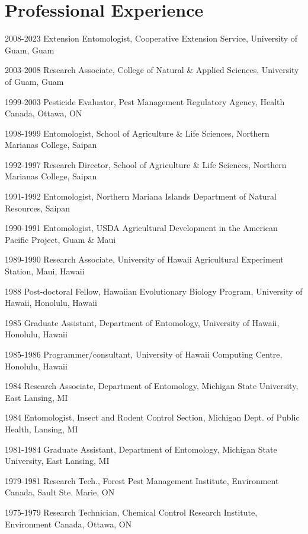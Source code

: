 \documentclass[12pt,english]{simplecv}
\begin{document}
\section{Professional Experience}
\begin{topic}
\item [{2008-2023}] Extension Entomologist, Cooperative Extension Service, University of Guam, Guam 
\item [{2003-2008}] Research Associate, College of Natural \& Applied Sciences, University of Guam, Guam 
\item [{1999-2003}] Pesticide Evaluator, Pest Management Regulatory Agency, Health Canada, Ottawa, ON
\item [{1998-1999}] Entomologist, School of Agriculture \& Life Sciences,
Northern Marianas College, Saipan 
\item [{1992-1997}] Research Director, School of Agriculture \& Life Sciences,
Northern Marianas College, Saipan 
\item [{1991-1992}] Entomologist, Northern Mariana Islands Department of
Natural Resources, Saipan
\item [{1990-1991}] Entomologist, USDA Agricultural Development in the
American Pacific Project, Guam \& Maui
\item [{1989-1990}] Research Associate, University of Hawaii Agricultural
Experiment Station, Maui, Hawaii
\item [{1988}] Post-doctoral Fellow, Hawaiian Evolutionary Biology Program,
University of Hawaii, Honolulu, Hawaii 
\item [{1985\textendash 1988}] Graduate Assistant, Department of Entomology,
University of Hawaii, Honolulu, Hawaii 
\item [{1985-1986}] Programmer/consultant, University of Hawaii Computing
Centre, Honolulu, Hawaii
\item [{1984}] Research Associate, Department of Entomology, Michigan State
University, East Lansing, MI
\item [{1984}] Entomologist, Insect and Rodent Control Section, Michigan
Dept. of Public Health, Lansing, MI
\item [{1981-1984}] Graduate Assistant, Department of Entomology, Michigan
State University, East Lansing, MI 
\item [{1979-1981}] Research Tech., Forest Pest Management Institute, Environment
Canada, Sault Ste. Marie, ON
\item [{1975-1979}] Research Technician, Chemical Control Research Institute,
Environment Canada, Ottawa, ON
\end{topic}
\end{document}

